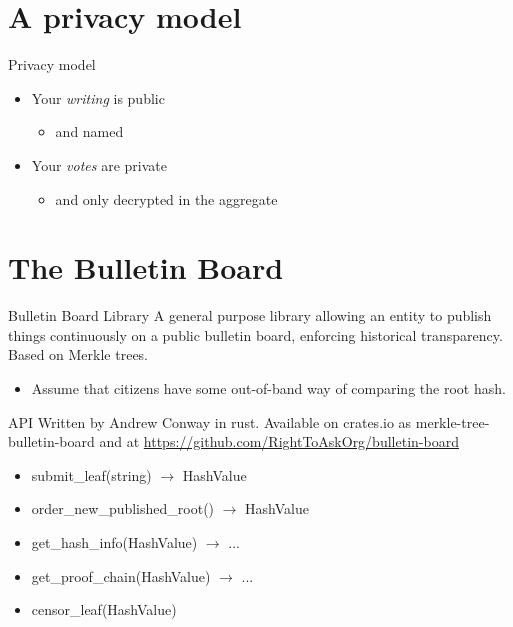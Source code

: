 \documentclass[10pt,xcolor=svgnames,169]{beamer} %
\begin{document}
	
	\section{A privacy model}
	\begin{frame}[standout]{Privacy model} 
		
		\begin{itemize}
			\item Your \emph{writing} is public
				\begin{itemize} 
					\item and named
				\end{itemize}
			\item Your \emph{votes} are private 
				\begin{itemize}
					\item and only decrypted in the aggregate
				\end{itemize}
		\end{itemize}
	\end{frame}
	
	\section{The Bulletin Board}
	
	       
	\begin{frame}[fragile]{Bulletin Board Library}
		A general purpose library allowing an entity to publish
		things continuously on a public bulletin board, enforcing historical transparency.
		Based on Merkle trees.
		
		\begin{itemize}
			\item Assume that citizens have some out-of-band way of comparing the root hash.
		\end{itemize}
	\end{frame}
	
	
	\begin{frame}[fragile]{API}
		Written by Andrew Conway in rust. Available on crates.io as merkle-tree-bulletin-board
		and at \url{https://github.com/RightToAskOrg/bulletin-board}
		\begin{itemize}
			\item submit\_leaf(string) $\rightarrow$ HashValue
			\item order\_new\_published\_root() $\rightarrow$ HashValue
			\item get\_hash\_info(HashValue) $\rightarrow$ ...
			\item get\_proof\_chain(HashValue) $\rightarrow$ ...
			\item censor\_leaf(HashValue)
		\end{itemize}
		
	\end{frame}
	
\end{document}
